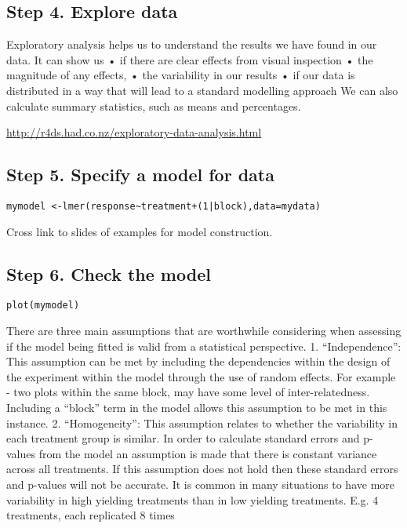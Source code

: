 \documentclass[]{book}
\theoremstyle{definition}
\theoremstyle{definition}
\theoremstyle{definition}
\theoremstyle{remark}
\begin{document}
\subsection{Step 4. Explore data}\label{step-4.-explore-data-1}

Exploratory analysis helps us to understand the results we have found in
our data. It can show us • if there are clear effects from visual
inspection • the magnitude of any effects, • the variability in our
results • if our data is distributed in a way that will lead to a
standard modelling approach We can also calculate summary statistics,
such as means and percentages.

\url{http://r4ds.had.co.nz/exploratory-data-analysis.html}

\subsection{Step 5. Specify a model for
data}\label{step-5.-specify-a-model-for-data-1}

\begin{verbatim}
mymodel <-lmer(response~treatment+(1|block),data=mydata)
\end{verbatim}

Cross link to slides of examples for model construction.

\subsection{Step 6. Check the model}\label{step-6.-check-the-model-1}

\begin{verbatim}
plot(mymodel)
\end{verbatim}

There are three main assumptions that are worthwhile considering when
assessing if the model being fitted is valid from a statistical
perspective. 1. ``Independence'': This assumption can be met by
including the dependencies within the design of the experiment within
the model through the use of random effects. For example - two plots
within the same block, may have some level of inter-relatedness.
Including a ``block'' term in the model allows this assumption to be met
in this instance. 2. ``Homogeneity'': This assumption relates to whether
the variability in each treatment group is similar. In order to
calculate standard errors and p-values from the model an assumption is
made that there is constant variance across all treatments. If this
assumption does not hold then these standard errors and p-values will
not be accurate. It is common in many situations to have more
variability in high yielding treatments than in low yielding treatments.
E.g. 4 treatments, each replicated 8 times
\end{document}
